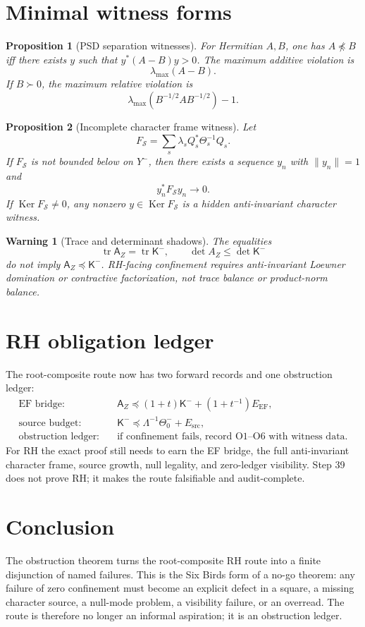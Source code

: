 \documentclass[11pt]{article}
\newtheorem{proposition}{Proposition}
\newtheorem{warning}{Warning}
\newcommand{\K}{\mathsf K}
\newcommand{\A}{\mathsf A}
\newcommand{\EF}{\mathrm{EF}}
\newcommand{\src}{\mathrm{src}}
\newcommand{\tr}{\operatorname{tr}}
\newcommand{\Ker}{\operatorname{Ker}}
\newcommand{\pre}{\preceq}
\begin{document}
\section{Minimal witness forms}

\begin{proposition}[PSD separation witnesses]
For Hermitian $A,B$, one has $A\npreceq B$ iff there exists $y$ such that $y^*(A-B)y>0$.  The maximum additive violation is
\[
\lambda_{\max}(A-B).
\]
If $B\succ0$, the maximum relative violation is
\[
\lambda_{\max}(B^{-1/2}AB^{-1/2})-1.
\]
\end{proposition}

\begin{proposition}[Incomplete character frame witness]
Let
\[
F_{\mathcal S}=\sum_s\lambda_sQ_s^*\Theta_s^{-1}Q_s.
\]
If $F_{\mathcal S}$ is not bounded below on $Y^-$, then there exists a sequence $y_n$ with $\|y_n\|=1$ and
\[
y_n^*F_{\mathcal S}y_n\to0.
\]
If $\Ker F_{\mathcal S}\ne0$, any nonzero $y\in\Ker F_{\mathcal S}$ is a hidden anti-invariant character witness.
\end{proposition}

\begin{warning}[Trace and determinant shadows]
The equalities
\[
\tr\A_Z=\tr\K^-,
\qquad
\det A_Z\le\det\K^-
\]
do not imply $\A_Z\pre\K^-$.  RH-facing confinement requires anti-invariant Loewner domination or contractive factorization, not trace balance or product-norm balance.
\end{warning}

\section{RH obligation ledger}

The root-composite route now has two forward records and one obstruction ledger:
\begin{align*}
\text{EF bridge:}\quad& \A_Z\pre (1+t)\K^-+(1+t^{-1})E_{\EF},\\
\text{source budget:}\quad& \K^-\pre \Lambda^{-1}\Theta_0^-+E_{\src},\\
\text{obstruction ledger:}\quad& \text{if confinement fails, record O1--O6 with witness data.}
\end{align*}
For RH the exact proof still needs to earn the EF bridge, the full anti-invariant character frame, source growth, null legality, and zero-ledger visibility.  Step 39 does not prove RH; it makes the route falsifiable and audit-complete.

\section{Conclusion}

The obstruction theorem turns the root-composite RH route into a finite disjunction of named failures.  This is the Six Birds form of a no-go theorem: any failure of zero confinement must become an explicit defect in a square, a missing character source, a null-mode problem, a visibility failure, or an overread.  The route is therefore no longer an informal aspiration; it is an obstruction ledger.
\end{document}

